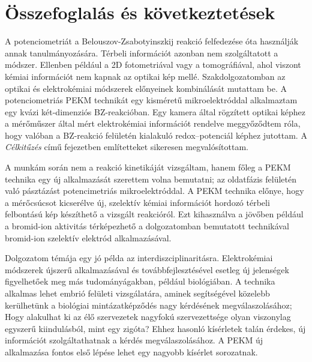 \chapter{Összefoglalás és következtetések}
\pagestyle{headings}
A potenciometriát a Belouszov-Zsabotyinszkij reakció felfedezése óta használják annak tanulmányozására. Térbeli információt azonban nem szolgáltatott a módszer. Ellenben például a 2D fotometriával vagy a tomográfiával, ahol viszont kémiai információt nem kapnak az optikai kép mellé. Szakdolgozatomban az optikai és elektrokémiai módszerek előnyeinek kombinálását mutattam be. A potenciometriás PEKM technikát egy kisméretű mikroelektróddal alkalmaztam egy kvázi két-dimenziós BZ-reakcióban. Egy kamera által rögzített optikai képhez a mérőműszer által mért elektrokémiai információt rendelve meggyőződtem róla, hogy valóban a BZ-reakció felületén kialakuló redox--potenciál képhez jutottam. A \emph{Célkitűzés} című fejezetben említetteket sikeresen megvalósítottam.

A munkám során nem a reakció kinetikáját vizsgáltam, hanem főleg a PEKM technika egy új alkalmazását szerettem volna bemutatni; az oldatfázis felületén való pásztázást potencimetriás mikroelektróddal. A PEKM technika előnye, hogy a mérőcsúcsot kicserélve új, szelektív kémiai információt hordozó térbeli felbontású kép készíthető a vizsgált reakcióról. Ezt kihasználva a jövőben például a bromid-ion aktivitás térképezhető a dolgozatomban bemutatott technikával bromid-ion szelektív elektród alkalmazásával.

Dolgozatom témája egy jó példa az interdiszciplinaritásra. Elektrokémiai módszerek újszerű alkalmazásával és továbbfejlesztésével esetleg új jelenségek figyelhetőek meg más tudományágakban, például biológiában. A technika alkalmas lehet embrió felületi vizsgálatára, aminek segítségével közelebb kerülhetünk a biológiai mintázatképződés nagy kérdésének megválaszolásához; Hogy alakulhat ki az élő szervezetek nagyfokú szervezettsége olyan viszonylag egyszerű kiindulásból, mint egy zigóta? Ehhez hasonló kísérletek talán érdekes, új információt szolgáltathatnak a kérdés megválaszolásához. A PEKM új alkalmazása fontos első lépése lehet egy nagyobb kísérlet sorozatnak.
